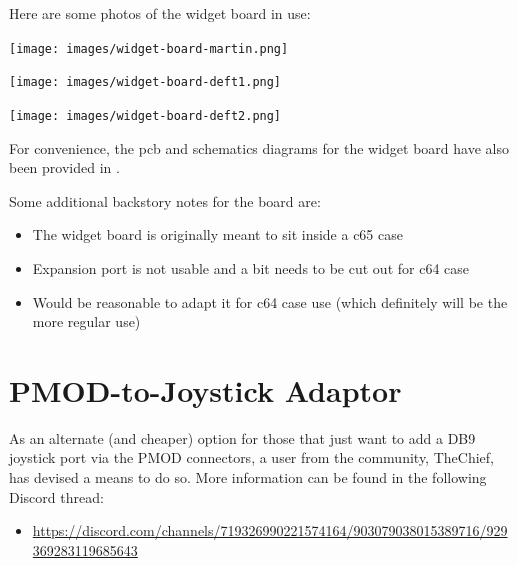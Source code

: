 Here are some photos of the widget board in use:
  \begin{center}
    \texttt{[image: images/widget-board-martin.png]}
  \end{center}
  \begin{center}
    \texttt{[image: images/widget-board-deft1.png]}
  \end{center}
  \begin{center}
    \texttt{[image: images/widget-board-deft2.png]}
  \end{center}

For convenience, the pcb and schematics diagrams for the widget board have also been provided in .

Some additional backstory notes for the board are:

\begin{itemize}
  \item{The widget board is originally meant to sit inside a c65 case}
  \item{Expansion port is not usable and a bit needs to be cut out for c64 case}
  \item{Would be reasonable to adapt it for c64 case use (which definitely will be the more regular use)}
\end{itemize}

\section{PMOD-to-Joystick Adaptor}

As an alternate (and cheaper) option for those that just want to add a DB9 joystick port via the PMOD connectors, a user from the community, TheChief, has devised a means to do so. More information can be found in the following Discord thread:

\begin{itemize}
  \item \url{https://discord.com/channels/719326990221574164/903079038015389716/929369283119685643}
\end{itemize}

